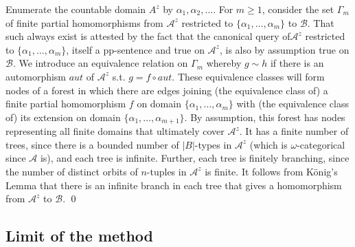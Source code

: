 \documentclass{LMCS}
\begin{document}
Enumerate the countable domain $A^z$ by $\alpha_1,\alpha_2,\ldots$. For $m \geq 1$, consider the set $\Gamma_m$ of finite partial homomorphisms from $\mathcal{A}^z$ restricted to $\{\alpha_1,\ldots,\alpha_m\}$ to $\mathcal{B}$. That such always exist is attested by the fact that the canonical query of$\mathcal{A}^z$ restricted to $\{\alpha_1,\ldots,\alpha_m\}$, itself a pp-sentence and true on  $\mathcal{A}^z$, is also by assumption true on $\mathcal{B}$. We introduce an equivalence relation on $\Gamma_m$ whereby $g\sim h$ if there is an automorphism $\mathit{aut}$ of $\mathcal{A}^z$ s.t. $g=f \circ \mathit{aut}$. These equivalence classes will form nodes of a forest in which there are edges joining (the equivalence class of) a finite partial homomorphism $f$ on domain $\{\alpha_1,\ldots,\alpha_m\}$ with (the equivalence class of) its extension on domain $\{\alpha_1,\ldots,\alpha_{m+1}\}$. By assumption, this forest has nodes representing all finite domains that ultimately cover $\mathcal{A}^z$. It has a  finite number of trees, since there is a bounded number of $|B|$-types in $\mathcal{A}^z$ (which is $\omega$-categorical since $\mathcal{A}$ is), and each tree is infinite. Further, each tree is finitely branching, since the number of distinct orbits of $n$-tuples in $\mathcal{A}^z$ is finite. It follows from K\"onig's Lemma that there is an infinite branch in each tree that gives a homomorphism from $\mathcal{A}^z$ to $\mathcal{B}$.
\qed


\subsection{Limit of the method}
\label{sec:limit}
\end{document}
